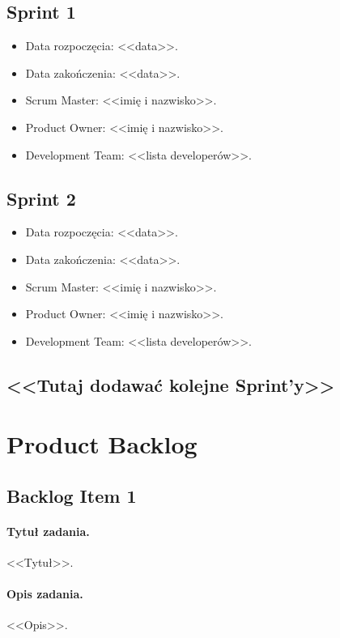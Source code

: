 \documentclass[a4paper]{article}
\begin{document}
\subsection{Sprint 1}

\begin{itemize}
\item Data rozpoczęcia: <<data>>.
\item Data zakończenia: <<data>>.
\item Scrum Master: <<imię i nazwisko>>.
\item Product Owner: <<imię i nazwisko>>.
\item Development Team: <<lista developerów>>.
\end{itemize}

\subsection{Sprint 2}

\begin{itemize}
\item Data rozpoczęcia: <<data>>.
\item  Data zakończenia: <<data>>.
\item Scrum Master: <<imię i nazwisko>>.
\item Product Owner: <<imię i nazwisko>>.
\item Development Team: <<lista developerów>>.
\end{itemize}

\subsection*{<<Tutaj dodawać kolejne Sprint'y>>}

\section{Product Backlog}

\subsection{Backlog Item 1}
\paragraph{Tytuł zadania.} <<Tytuł>>.
\paragraph{Opis zadania.} <<Opis>>.
\end{document}
